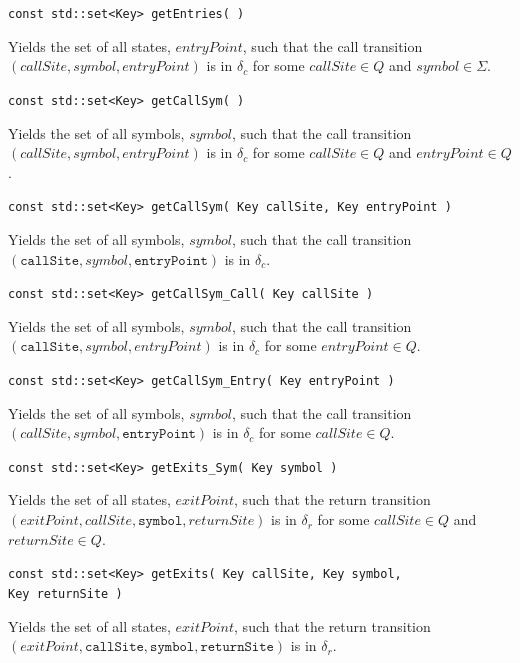 \documentclass{llncs}
\begin{document}
\begin{description}
  \item\texttt{const std::set<Key> getEntries( )} \nopagebreak

    Yields the set of all states, $entryPoint$, such that the call transition
    $(callSite,symbol,entryPoint)$ is in $\delta_c$ for some $callSite \in Q$
    and $symbol \in \Sigma$.

  \item\texttt{const std::set<Key> getCallSym( )} \nopagebreak

    Yields the set of all symbols, $symbol$, such that the call transition
    $(callSite,symbol,entryPoint)$ is in $\delta_c$ for some $callSite \in Q$
    and $entryPoint \in Q$.

  \item\texttt{const std::set<Key> getCallSym( Key callSite, Key entryPoint )} \nopagebreak

    Yields the set of all symbols, $symbol$, such that the call transition
    $(\texttt{callSite},symbol,\texttt{entryPoint})$ is in $\delta_c$.

  \item\texttt{const std::set<Key> getCallSym\_Call( Key callSite )} \nopagebreak

    Yields the set of all symbols, $symbol$, such that the call transition
    $(\texttt{callSite},symbol,entryPoint)$ is in $\delta_c$ for some
    $entryPoint \in Q$.

  \item\texttt{const std::set<Key> getCallSym\_Entry( Key entryPoint )} \nopagebreak

    Yields the set of all symbols, $symbol$, such that the call transition
    $(callSite,symbol,\texttt{entryPoint})$ is in $\delta_c$ for some
    $callSite \in Q$.

  \item\texttt{const std::set<Key> getExits\_Sym( Key symbol )} \nopagebreak

    Yields the set of all states, $exitPoint$, such that the return
    transition $(exitPoint,callSite,\texttt{symbol},returnSite)$ is in
    $\delta_r$ for some $callSite \in Q$ and $returnSite \in Q$.

  \item\texttt{const std::set<Key> getExits( Key callSite, Key symbol,\\ \hspace*{3.25cm} Key returnSite )} \nopagebreak

    Yields the set of all states, $exitPoint$, such that the return
    transition
    $(exitPoint,\texttt{callSite},\texttt{symbol},\texttt{returnSite})$ is in
    $\delta_r$.


\end{description}
\end{document}
